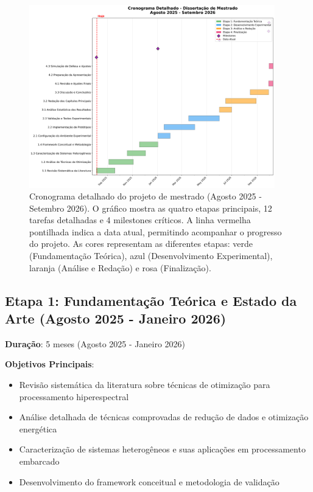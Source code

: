\begin{figure}[htbp]
\centering
\includegraphics[width=0.95\textwidth]{figuras/cronograma_mestrado_gantt.png}
\caption{Cronograma detalhado do projeto de mestrado (Agosto 2025 - Setembro 2026). O gráfico mostra as quatro etapas principais, 12 tarefas detalhadas e 4 milestones críticos. A linha vermelha pontilhada indica a data atual, permitindo acompanhar o progresso do projeto. As cores representam as diferentes etapas: verde (Fundamentação Teórica), azul (Desenvolvimento Experimental), laranja (Análise e Redação) e rosa (Finalização).}
\label{fig:cronograma}
\end{figure}

\subsection{Etapa 1: Fundamentação Teórica e Estado da Arte (Agosto 2025 - Janeiro 2026)}

\textbf{Duração}: 5 meses (Agosto 2025 - Janeiro 2026)

\textbf{Objetivos Principais}:
\begin{itemize}
\item Revisão sistemática da literatura sobre técnicas de otimização para processamento hiperespectral
\item Análise detalhada de técnicas comprovadas de redução de dados e otimização energética
\item Caracterização de sistemas heterogêneos e suas aplicações em processamento embarcado
\item Desenvolvimento do framework conceitual e metodologia de validação
\end{itemize}

